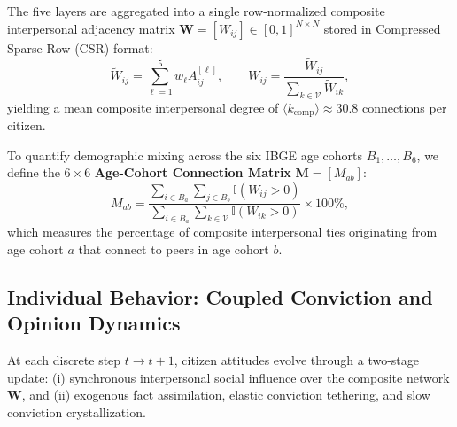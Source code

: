 The five layers are aggregated into a single row-normalized composite interpersonal adjacency matrix $\mathbf{W} = [W_{ij}] \in [0, 1]^{N \times N}$ stored in Compressed Sparse Row (CSR) format:
\begin{equation}
    \tilde{W}_{ij} = \sum_{\ell=1}^5 w_\ell A_{ij}^{[\ell]}, \qquad
    W_{ij} = \frac{\tilde{W}_{ij}}{\sum_{k \in \mathcal{V}} \tilde{W}_{ik}},
    \label{eq:composite_csr}
\end{equation}
yielding a mean composite interpersonal degree of $\langle k_{\mathrm{comp}} \rangle \approx 30.8$ connections per citizen.

To quantify demographic mixing across the six IBGE age cohorts $B_1, \dots, B_6$, we define the $6 \times 6$ \textbf{Age-Cohort Connection Matrix} $\mathbf{M} = [M_{ab}]$:
\begin{equation}
    M_{ab} = \frac{\sum_{i \in B_a} \sum_{j \in B_b} \mathbb{I}(W_{ij} > 0)}{\sum_{i \in B_a} \sum_{k \in \mathcal{V}} \mathbb{I}(W_{ik} > 0)} \times 100\%,
    \label{eq:age_cohort_matrix}
\end{equation}
which measures the percentage of composite interpersonal ties originating from age cohort $a$ that connect to peers in age cohort $b$.

\subsection{Individual Behavior: Coupled Conviction and Opinion Dynamics}
\label{subsec:dynamics_equations}

At each discrete step $t \to t + 1$, citizen attitudes evolve through a two-stage update: (i) synchronous interpersonal social influence over the composite network $\mathbf{W}$, and (ii) exogenous fact assimilation, elastic conviction tethering, and slow conviction crystallization.

